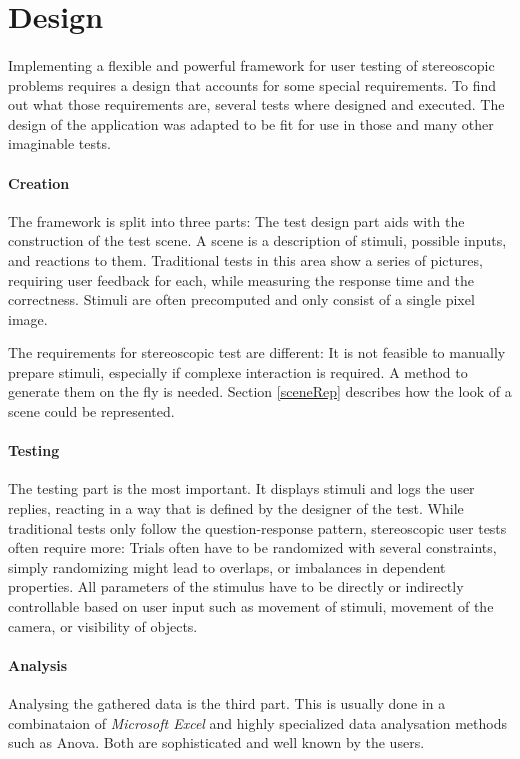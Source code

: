 \section{Design\label{Design}}
\paragraph{}
Implementing a flexible and powerful framework for user testing of stereoscopic problems requires a design that accounts for some special requirements. To find out what those requirements are, several tests where designed and executed. The design of the application was adapted to be fit for use in those and many other imaginable tests.

\paragraph{Creation}
The framework is split into three parts: The test design part aids with the construction of the test scene. A scene is a description of stimuli, possible inputs, and reactions to them. Traditional tests in this area show a series of pictures, requiring user feedback for each, while measuring the response time and the correctness. Stimuli are often precomputed and only consist of a single pixel image.

The requirements for stereoscopic test are different: It is not feasible to manually prepare stimuli, especially if complexe interaction is required. A method to generate them on the fly is needed.
Section \ref{sceneRep} describes how the look of a scene could be represented.

\paragraph{Testing}
The testing part is the most important. It displays stimuli and logs the user replies, reacting in a way that is defined by the designer of the test. While traditional tests only follow the question-response pattern, stereoscopic user tests often require more: Trials often have to be randomized with several constraints, simply randomizing might lead to overlaps, or imbalances in dependent properties. All parameters of the stimulus have to be directly or indirectly controllable based on user input such as movement of stimuli, movement of the camera, or visibility of objects.

\paragraph{Analysis}
Analysing the gathered data is the third part. This is usually done in a combinataion of \textit{Microsoft Excel} and highly specialized data analysation methods such as Anova. Both are sophisticated and well known by the users.

